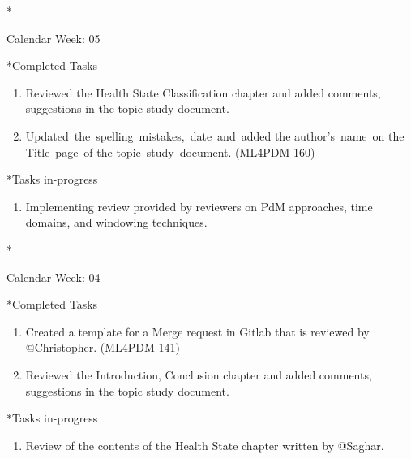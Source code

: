 \documentclass[11pt,a4paper]{article}
\begin{document}
\newpage
\begin{section}*{Calendar Week: 05 \hfill \date{05 February, 2021}}
 \begin{subsection}*{Completed Tasks}
     \begin{enumerate}
         \item
               Reviewed the Health State Classification chapter and added comments, suggestions in the topic study document.
         \item
               Updated the spelling mistakes, date and added the author's name on the Title page of the topic study document. (\href{https://ml4pdm.atlassian.net/browse/ML4PDM-160}{ML4PDM-160})
     \end{enumerate}
 \end{subsection}

 \begin{subsection}*{Tasks in-progress}
     \begin{enumerate}
         \item
               Implementing review provided by reviewers on PdM approaches, time domains, and windowing techniques.
     \end{enumerate}
 \end{subsection}
\end{section}

\newpage
\begin{section}*{Calendar Week: 04 \hfill \date{29 January, 2021}}
 \begin{subsection}*{Completed Tasks}
     \begin{enumerate}
         \item
               Created a template for a Merge request in Gitlab that is reviewed by @Christopher. (\href{https://ml4pdm.atlassian.net/browse/ML4PDM-141}{ML4PDM-141})
         \item
               Reviewed the Introduction, Conclusion chapter and added comments, suggestions in the topic study document.
     \end{enumerate}
 \end{subsection}

 \begin{subsection}*{Tasks in-progress}
     \begin{enumerate}
         \item
               Review of the contents of the Health State chapter written by @Saghar.
     \end{enumerate}
 \end{subsection}
\end{section}
\end{document}
